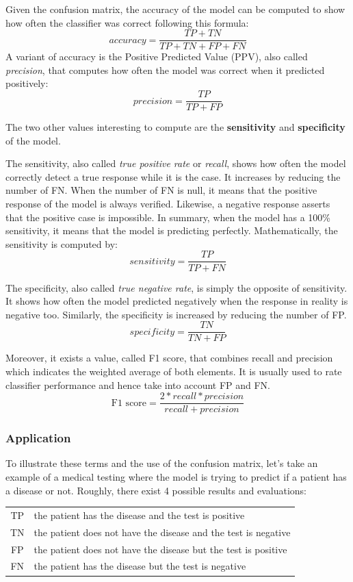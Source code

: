 \documentclass[11pt, openany]{report}
\theoremstyle{plain}
\theoremstyle{definition}
\theoremstyle{remark}
\begin{document}
Given the confusion matrix, the accuracy of the model can be computed to show how often the classifier was correct following this formula: 
$$ accuracy = \frac{TP + TN}{TP + TN + FP + FN} $$
A variant of accuracy is the Positive Predicted Value (PPV), also called \textit{precision}, that computes how often the model was correct when it predicted positively: 
$$ precision = \frac{TP}{TP + FP} $$ 

The two other values interesting to compute are the \textbf{sensitivity} and \textbf{specificity} of the model. 

The sensitivity, also called \textit{true positive rate} or \textit{recall}, shows how often the model correctly detect a true response while it is the case. It increases by reducing the number of FN. When the number of FN is null, it means that the positive response of the model is always verified. Likewise, a negative response asserts that the positive case is impossible. In summary, when the model has a 100\% sensitivity, it means that the model is predicting perfectly. Mathematically, the sensitivity is computed by: 
$$ sensitivity = \frac{TP}{TP + FN} $$ 

The specificity, also called \textit{true negative rate}, is simply the opposite of sensitivity. It shows how often the model predicted negatively when the response in reality is negative too. Similarly, the specificity is increased by reducing the number of FP.
$$ specificity = \frac{TN}{TN + FP} $$ 


Moreover, it exists a value, called {F1 score}, that combines recall and precision which indicates the weighted average of both elements. It is usually used to rate classifier performance and hence take into account FP and FN. 
$$ \text{F1 score} = \frac{2*recall*precision}{recall+precision} $$

\subsubsection{Application} \label{sec:appli-confusion-matrix}
To illustrate these terms and the use of the confusion matrix, let's take an example of a medical testing where the model is trying to predict if a patient has a disease or not. Roughly, there exist 4 possible results and evaluations: 
\begin{center}
    \begin{tabular}{cl}
      TP & the patient has the disease and the test is positive\\
      TN & the patient does not have the disease and the test is negative \\
      FP & the patient does not have the disease but the test is positive \\
      FN & the patient has the disease but the test is negative \\
    \end{tabular}
\end{center}
\end{document}
